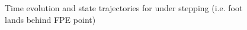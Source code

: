 \begin{figure}[!t]
	\begin{center}
	\end{center}
  	\caption{Time evolution and state trajectories for under stepping (i.e. foot lands behind FPE point)}
	\label{sim:under}
\end{figure}

